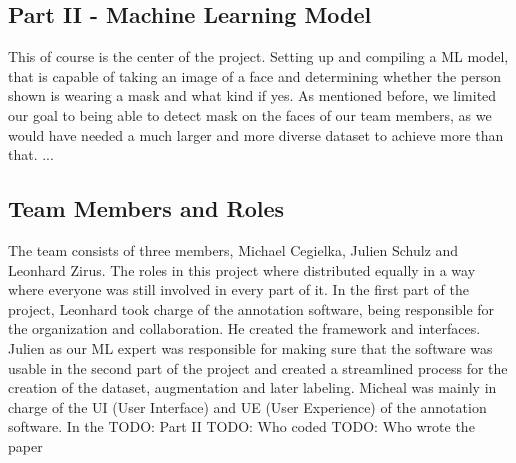 \subsection{Part II - Machine Learning Model}

This of course is the center of the project. Setting up and compiling a ML
model, that is capable of taking an image of a face and determining whether the
person shown is wearing a mask and what kind if yes.
\newline
As mentioned before, we limited our goal to being able to detect mask on the
faces of our team members, as we would have needed a much larger and more
diverse dataset to achieve more than that. 
...

\subsection{Team Members and Roles}

The team consists of three members, Michael Cegielka, Julien Schulz and Leonhard
Zirus. The roles in this project where distributed equally in a way where
everyone was still involved in every part of it. In the first part of the
project, Leonhard took charge of the annotation software, being responsible for
the organization and collaboration. He created the framework and interfaces.
Julien as our ML expert was responsible for making sure that the software was
usable in the second part of the project and created a streamlined process for
the creation of the dataset, augmentation and later labeling. Micheal was mainly
in charge of the UI (User Interface) and UE (User Experience) of the annotation
software.
In the 
TODO: Part II
TODO: Who coded
TODO: Who wrote the paper